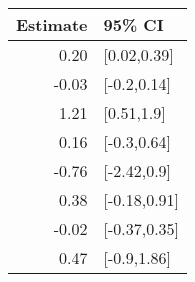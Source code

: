 \begin{tabular}{rl}
  \hline
Estimate & 95\% CI \\ 
  \hline
0.20 & [0.02,0.39] \\ 
  -0.03 & [-0.2,0.14] \\ 
  1.21 & [0.51,1.9] \\ 
  0.16 & [-0.3,0.64] \\ 
  -0.76 & [-2.42,0.9] \\ 
  0.38 & [-0.18,0.91] \\ 
  -0.02 & [-0.37,0.35] \\ 
  0.47 & [-0.9,1.86] \\ 
   \hline
\end{tabular}

